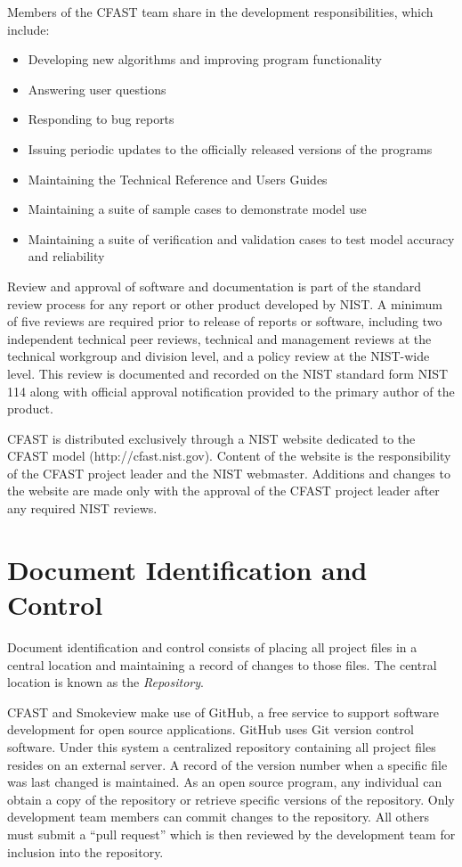 \documentclass[12pt]{book}
\begin{document}
Members of the CFAST team share in the development responsibilities, which include:
\begin{itemize}
    \item Developing new algorithms and improving program functionality
    \item Answering user questions
    \item Responding to bug reports
    \item Issuing periodic updates to the officially released versions of the programs
    \item Maintaining the Technical Reference and Users Guides
    \item Maintaining a suite of sample cases to demonstrate model use
    \item Maintaining a suite of verification and validation cases to test model accuracy and reliability
\end{itemize}

Review and approval of software and documentation is part of the standard review process for any report or other product developed by NIST. A minimum of five reviews are required prior to release of reports or software, including two independent technical peer reviews, technical and management reviews at the technical workgroup and division level, and a policy review at the NIST-wide level.  This review is documented and recorded on the NIST standard form NIST 114 along with official approval notification provided to the primary author of the product.

CFAST is distributed exclusively through a NIST website dedicated to the CFAST model (http://cfast.nist.gov).  Content of the website is the responsibility of the CFAST project leader and the NIST webmaster. Additions and changes to the website are made only with the approval of the CFAST project leader after any required NIST reviews.

\section{Document Identification and Control}

Document identification and control consists of placing all project files in a central location and maintaining a record of changes to those files. The central location is known as the {\em Repository}.

CFAST and Smokeview make use of GitHub, a free service to support software development for open source applications. GitHub uses Git version control software. Under this system a centralized repository containing all project files resides on an external server.   A record of the version number when a specific file was last changed is maintained. As an open source program, any individual can obtain a copy of the repository or retrieve specific versions of the repository. Only development team members can commit changes to the repository. All others must submit a “pull request” which is then reviewed by the development team for inclusion into the repository.
\end{document}
